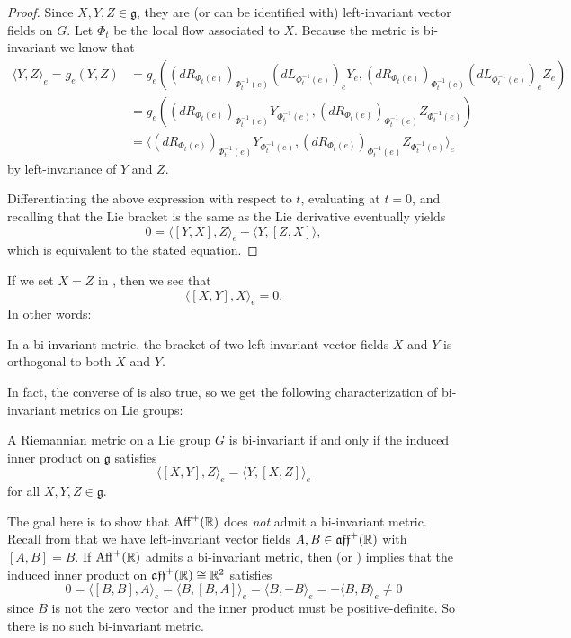 \begin{proof}
	Since $X,Y,Z \in \mathfrak{g}$, they are (or can be identified with) left-invariant vector fields on $G$. Let $\Phi_t$ be the local flow associated to $X$. Because the metric is bi-invariant we know that
	\begin{align*}
		\langle Y, Z \rangle_e = g_e(Y,Z) & = g_e \left( (dR_{\Phi_t(e)})_{\Phi_t^{-1}(e)}(dL_{\Phi_t^{-1}(e)} )_e Y_e, (dR_{\Phi_t(e)})_{\Phi_t^{-1}(e)}(dL_{\Phi_t^{-1}(e) })_e Z_e\right) \\
		& = g_e \left( (dR_{\Phi_t(e)})_{\Phi_t^{-1}(e)} Y_{\Phi_t^{-1}(e)}, (dR_{\Phi_t(e)})_{\Phi_t^{-1}(e)} Z_{\Phi_t^{-1}(e)}\right) \\
		& = \langle (dR_{\Phi_t(e)})_{\Phi_t^{-1}(e)} Y_{\Phi_t^{-1}(e)}, (dR_{\Phi_t(e)})_{\Phi_t^{-1}(e)} Z_{\Phi_t^{-1}(e)} \rangle_e
	\end{align*}
	by left-invariance of $Y$ and $Z$. 
	
	Differentiating the above expression with respect to $t$, evaluating at $t=0$, and recalling that the Lie bracket is the same as the Lie derivative eventually yields
	\[
		0 = \langle [Y,X],Z \rangle_e + \langle Y, [Z,X] \rangle,
	\]
	which is equivalent to the stated equation.
\end{proof}

If we set $X=Z$ in , then we see that
\[
	\langle [X,Y],X \rangle_e = 0.
\]
In other words:
\begin{corollary}\label{cor:bracket orthogonal}
	In a bi-invariant metric, the bracket of two left-invariant vector fields $X$ and $Y$ is orthogonal to both $X$ and $Y$. 
\end{corollary}

In fact, the converse of  is also true, so we get the following characterization of bi-invariant metrics on Lie groups:

\begin{theorem}\label{thm:bi-invariant metric condition}
	A Riemannian metric on a Lie group $G$ is bi-invariant if and only if the induced inner product on $\mathfrak{g}$ satisfies
	\[
		\langle [X,Y],Z\rangle_e = \langle Y, [X,Z]\rangle_e
	\]
	for all $X,Y,Z \in \mathfrak{g}$.
\end{theorem}


\begin{example}\label{ex:no bi-invariant metric on aff}
	The goal here is to show that $\operatorname{Aff}^+(\mathbb{R})$ does \emph{not} admit a bi-invariant metric. Recall from  that we have left-invariant vector fields $A,B \in \mathfrak{aff}^+(\mathbb{R})$ with $[A,B]=B$. If $\operatorname{Aff}^+(\mathbb{R})$ admits a bi-invariant metric, then  (or ) implies that the induced inner product on $\mathfrak{aff}^+(\mathbb{R}) \cong \mathbb{R}^2$ satisfies
	\[
		0 = \langle [B,B],A \rangle_e = \langle B, [B,A] \rangle_e = \langle B, -B\rangle_e = -\langle B,B\rangle_e \neq 0
	\]
	since $B$ is not the zero vector and the inner product must be positive-definite. So there is no such bi-invariant metric.
\end{example}

